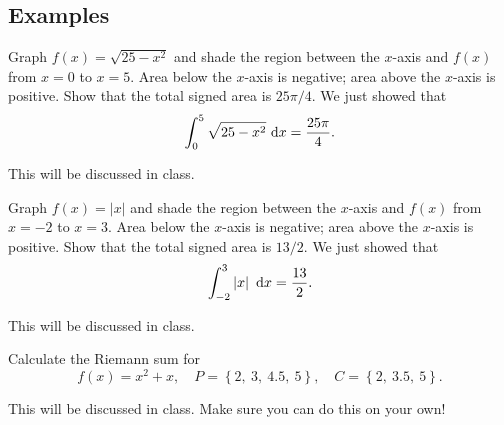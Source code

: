 \documentclass[12pt,addpoints, answers, fleqn]{exam}
\begin{document}
\subsection{Examples}

\begin{questions}


\question  Graph $f\left(x\right) = \sqrt{25-x^2}$ and shade the region between the $x$-axis and $f\left(x\right)$ from $x=0$ to $x=5$. Area below the $x$-axis is negative; area above the $x$-axis is positive. Show that the total signed area is $25\pi/4$. We just showed that
\[
\int_{0}^{5} \sqrt{25-x^2} \ {\rm{d}}x = \frac{25\pi}{4}.
\]

\begin{solution}
This will be discussed in class.
\end{solution}

\question Graph $f\left(x\right) = \left| x \right|$ and shade the region between the $x$-axis and $f\left(x\right)$ from $x=-2$ to $x=3$. Area below the $x$-axis is negative; area above the $x$-axis is positive. Show that the total signed area is $13/2$. We just showed that
\[
\int_{-2}^{3} \left| x \right| \ {\rm{d}}x = \frac{13}{2}.
\]

\begin{solution}
This will be discussed in class.
\end{solution}

\question  Calculate the Riemann sum for
\[
f\left( x \right) = x^2+x, \quad P = \left\{ 2, \ 3, \ 4.5, \ 5 \right\}, \quad  C = \left\{ 2, \ 3.5, \ 5 \right\}.
\]

\begin{solution}
This will be discussed in class. Make sure you can do this on your own!


\end{solution}
\end{questions}
\end{document}
